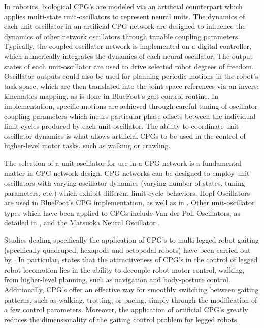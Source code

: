 		In robotics, biological CPG's are modeled via an artificial counterpart which applies multi-state unit-oscillators to represent neural units. The dynamics of each unit oscillator in an artificial CPG network are designed to influence the dynamics of other network oscillators through tunable coupling parameters. Typically, the coupled oscillator network is implemented on a digital controller, which numerically integrates the dynamics of each neural oscillator. The output states of each unit-oscillator are used to drive selected robot degrees of freedom. Oscillator outputs could also be used for planning periodic motions in the robot's task space, which are then translated into the joint-space references via an inverse kinematics mapping, as is done in BlueFoot's gait control routine. In implementation, specific motions are achieved  through careful tuning of oscillator coupling parameters which incurs particular phase offsets between the individual limit-cycles produced by each unit-oscillator. The ability to coordinate unit-oscillator dynamics is what allows artificial CPGs to be used in the control of higher-level motor tasks, such as walking or crawling.

		The selection of a unit-oscillator for use in a CPG network is a fundamental matter in CPG network design. CPG networks can be designed to employ unit-oscillators with varying oscillator dynamics (\IE varying number of states, tuning parameters, etc.) which exhibit different limit-cycle behaviors. Hopf Oscillators are used in BlueFoot's CPG implementation, as well as in \cite{Righetti2006,Rutishauser2008,Matos2010}. Other unit-oscillator types which have been applied to CPGs include Van der Poll Oscillators, as detailed in \cite{Ijspeert2008}, and the Matsuoka Neural Oscillator \cite{Endo2004}.

		Studies dealing specifically the application of CPG's to multi-legged robot gaiting (specifically quadruped, hexapods and octopodal robots) have been carried out by \cite{Arena2001,Klaassen2002,Arena2004,Inagaki2003,Inagaki2006,Billard2000,Brambilla2006,Buchli2006,Tsujita2001,Tsujita2004}.  In particular, \cite{Ijspeert2008} states that the attractiveness of CPG's in the control of legged robot locomotion lies in the ability to decouple robot motor control, \IE walking, from higher-level planning, such as navigation and body-posture control. Additionally, CPG's offer an effective way for smoothly switching between gaiting patterns, such as walking, trotting, or pacing, simply through the modification of a few control parameters. Moreover, the application of artificial CPG's greatly reduces the dimensionality of the gaiting control problem for legged robots.

